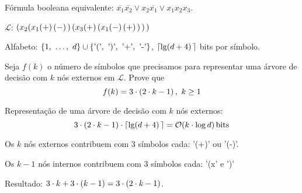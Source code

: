 {\begin{exemplo}

  Fórmula booleana equivalente: $\overline{x_1}\overline{x_2}\lor x_2\overline{x_1}\lor x_1x_2x_3$.

  {
    \delimitershortfall=-1pt                        %
    $\mathcal{L}$: 
    $\l(x_2
            \l(x_1
                  \l(+\r)
                  \l(-\r)
            \r)
            \l(x_3
                  \l(+\r)
                  \l(x_1
                      \l(-\r)
                      \l(+\r)
                  \r)
            \r)
      \r)$
  }

  Alfabeto: $\l\{1,\ \ldots,\ d\r\}\cup\l\{\text{'('},\ \text{')'},\ \text{'+'},\ \text{'-'}\r\}$, $\l\lceil\lg\l(d+4\r)\r\rceil$ bits por símbolo.
\end{exemplo}

\begin{exercicio}
  Seja $f(k)$ o número de símbolos que precisamos para representar uma árvore de decisão com $k$ nós externos em $\mathcal{L}$. Prove que
  \[
    f(k) = 3\cdot\l(2\cdot k-1\r),\ k\geq 1
  \]

  Representação de uma árvore de decisão com $k$ nós externos:
  \[
    3\cdot\l(2\cdot k-1\r)\cdot\l\lceil\lg\l(d+4\r)\r\rceil = \mathcal{O}\l(k\cdot\log d\r) \text{bits}
  \]
\end{exercicio}
\begin{resolucao}
  Os $k$ nós externos contribuem com $3$ símbolos cada: '(+)' ou '(-)'.

  Os $k-1$ nós internos contribuem com $3$ símbolos cada: '(x' e ')'

  Resultado: $3\cdot k + 3\cdot\l(k-1\r) = 3\cdot\l(2\cdot k-1\r)$.


\end{resolucao}}
